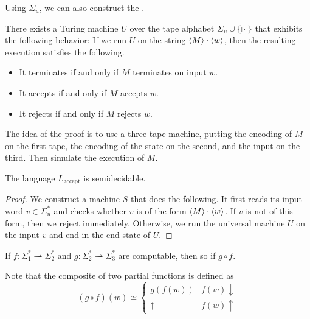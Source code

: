 
Using $\Sigma_u$, we can also construct the .

\begin{theorem}
  There exists a Turing machine $U$ over the tape alphabet $\Sigma_u \cup
  \{\boxdot\}$ that exhibits the following behavior:
  If we run $U$ on the string $\left< M \right> \cdot \left< w \right>$, then the resulting
  execution satisfies the following.
  \begin{itemize}
  \item It terminates if and only if $M$ terminates on input $w$.
  \item It accepts if and only if $M$ accepts $w$.
  \item It rejects if and only if $M$ rejects $w$.
  \end{itemize}
\end{theorem}

The idea of the proof is to use a three-tape machine, putting the encoding of
$M$ on the first tape, the encoding of the state on the second, and the input on
the third.
Then simulate the execution of $M$.

\begin{theorem}
  The language $L_{\text{accept}}$ is semidecidable.
\end{theorem}

\begin{proof}
  We construct a machine $S$ that does the following.
  It first reads its input word $v \in \Sigma_u^*$ and checks whether $v$ is of
  the form $\left< M \right> \cdot \left< w \right>$.
  If $v$ is not of this form, then we reject immediately.
  Otherwise, we run the universal machine $U$ on the input $v$ and end in the
  end state of $U$.
\end{proof}


\begin{proposition}
  If $f: \Sigma_1^* \rightharpoonup \Sigma_2^*$ and $g: \Sigma_2^*
  \rightharpoonup \Sigma_3^*$ are computable, then so if $g \circ f$.
\end{proposition}

Note that the composite of two partial functions is defined as
\[
  (g \circ f)(w) \simeq
  \begin{cases}
	g(f(w)) & f(w) \downarrow \\
	\uparrow & f(w) \uparrow
  \end{cases}
\]

